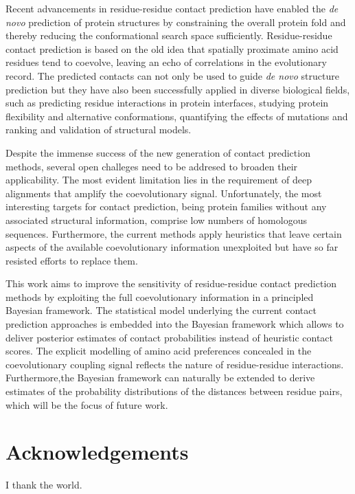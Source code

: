\documentclass[11pt,a4paper,twoside]{book}
\theoremstyle{definition}
\theoremstyle{definition}
\theoremstyle{remark}
\begin{document}
Recent advancements in residue-residue contact prediction have enabled
the \emph{de novo} prediction of protein structures by constraining the
overall protein fold and thereby reducing the conformational search
space sufficiently. Residue-residue contact prediction is based on the
old idea that spatially proximate amino acid residues tend to coevolve,
leaving an echo of correlations in the evolutionary record. The
predicted contacts can not only be used to guide \emph{de novo}
structure prediction but they have also been successfully applied in
diverse biological fields, such as predicting residue interactions in
protein interfaces, studying protein flexibility and alternative
conformations, quantifying the effects of mutations and ranking and
validation of structural models.

Despite the immense success of the new generation of contact prediction
methods, several open challeges need to be addresed to broaden their
applicability. The most evident limitation lies in the requirement of
deep alignments that amplify the coevolutionary signal. Unfortunately,
the most interesting targets for contact prediction, being protein
families without any associated structural information, comprise low
numbers of homologous sequences. Furthermore, the current methods apply
heuristics that leave certain aspects of the available coevolutionary
information unexploited but have so far resisted efforts to replace
them.

This work aims to improve the sensitivity of residue-residue contact
prediction methods by exploiting the full coevolutionary information in
a principled Bayesian framework. The statistical model underlying the
current contact prediction approaches is embedded into the Bayesian
framework which allows to deliver posterior estimates of contact
probabilities instead of heuristic contact scores. The explicit
modelling of amino acid preferences concealed in the coevolutionary
coupling signal reflects the nature of residue-residue interactions.
Furthermore,the Bayesian framework can naturally be extended to derive
estimates of the probability distributions of the distances between
residue pairs, which will be the focus of future work.

\chapter*{Acknowledgements}\label{acknowledgements}

I thank the world.
\end{document}

